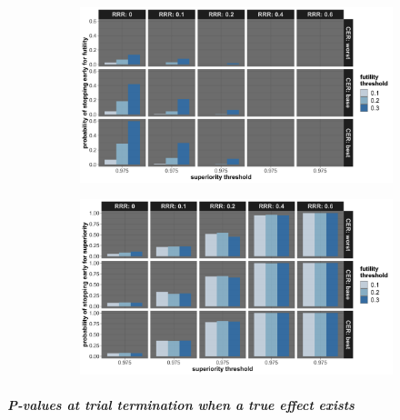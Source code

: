 \documentclass[]{article}
\let\oldsubparagraph\subparagraph
\renewcommand{\subparagraph}[1]{\oldsubparagraph{#1}\mbox{}}
\begin{document}
\begin{figure}
\centering
  \caption{Probability of stopping early due to futility, and stopping early due to superiority. Stopping probabilities
  are presented for the three control event rates (CER – rows), relative risk reductions (RRR – columns), and futility thresholds (x-axis).}
  \label{fig:fig}
  \begin{subfigure}{0.8\textwidth}
    \centering
    \caption{}
    \includegraphics{../p1_plots/batch_size_nb_2000/prob_stop_early_fut_p1.png}
  \end{subfigure}
  \begin{subfigure}{0.8\textwidth}
    \centering
    \caption{}
    \includegraphics{../p1_plots/batch_size_nb_2000/prob_stop_early_sup_p1.png}
  \end{subfigure}
\end{figure}

\clearpage

\hypertarget{p-values-at-trial-termination-when-a-true-effect-exists-1}{%
\subparagraph{P-values at trial termination when a true effect
exists}\label{p-values-at-trial-termination-when-a-true-effect-exists-1}}
\end{document}

